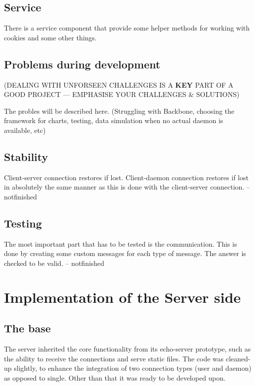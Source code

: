 \documentclass{l3proj}
\begin{document}
\subsection{Service}

There is a service component that provide some helper methods for working with cookies and some other things.


\subsection{Problems during development}

(DEALING WITH UNFORSEEN CHALLENGES IS A \textbf{KEY} PART OF A GOOD PROJECT --- EMPHASISE YOUR CHALLENGES \& SOLUTIONS)

The probles will be described here. (Struggling with Backbone, choosing the framework for charts, testing, data simulation when no actual daemon is available, etc)

\subsection{Stability}

Client-server connection restores if lost.
Client-daemon connection restores if lost in absolutely the same manner as this is done with the client-server connection.
-- notfinished

\subsection{Testing}

The most important part that has to be tested is the communication. This is done by creating some custom messages for each type of message. The answer is checked to be valid.
-- notfinished


\section{Implementation of the Server side}

\subsection{The base}

The server inherited the core functionality from its echo-server prototype, such as the ability to receive the connections and serve static files. The code was cleaned-up slightly, to enhance the integration of two connection types (user and daemon) as opposed to single. Other than that it was ready to be developed upon.
\end{document}
